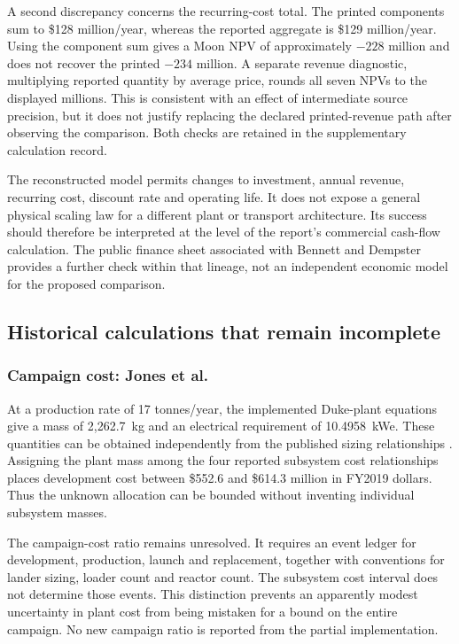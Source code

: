 \documentclass[final,5p,times,twocolumn]{elsarticle}
\begin{document}
A second discrepancy concerns the recurring-cost total. The printed components sum to \$128 million/year, whereas the reported aggregate is \$129 million/year. Using the component sum gives a Moon NPV of approximately $-228$ million and does not recover the printed $-234$ million. A separate revenue diagnostic, multiplying reported quantity by average price, rounds all seven NPVs to the displayed millions. This is consistent with an effect of intermediate source precision, but it does not justify replacing the declared printed-revenue path after observing the comparison. Both checks are retained in the supplementary calculation record.

The reconstructed model permits changes to investment, annual revenue, recurring cost, discount rate and operating life. It does not expose a general physical scaling law for a different plant or transport architecture. Its success should therefore be interpreted at the level of the report's commercial cash-flow calculation. The public finance sheet associated with Bennett and Dempster \cite{bennett2020} provides a further check within that lineage, not an independent economic model for the proposed comparison.

\subsection{Historical calculations that remain incomplete}
\subsubsection{Campaign cost: Jones et al.}
At a production rate of 17 tonnes/year, the implemented Duke-plant equations give a mass of 2,262.7~kg and an electrical requirement of 10.4958~kWe. These quantities can be obtained independently from the published sizing relationships \cite{jones2020}. Assigning the plant mass among the four reported subsystem cost relationships places development cost between \$552.6 and \$614.3 million in FY2019 dollars. Thus the unknown allocation can be bounded without inventing individual subsystem masses.

The campaign-cost ratio remains unresolved. It requires an event ledger for development, production, launch and replacement, together with conventions for lander sizing, loader count and reactor count. The subsystem cost interval does not determine those events. This distinction prevents an apparently modest uncertainty in plant cost from being mistaken for a bound on the entire campaign. No new campaign ratio is reported from the partial implementation.
\end{document}
